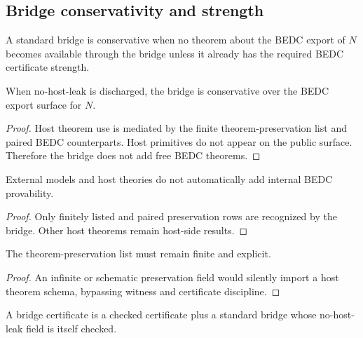 \subsection{Bridge conservativity and strength}
\label{subsec:philosophy-bridge-conservativity-strength}

\begin{definition}
\label{def:philosophy-bridge-conservativity}
A standard bridge is conservative when no theorem about the BEDC export
of \(N\) becomes available through the bridge unless it already has the
required BEDC certificate strength.
\end{definition}

\begin{theorem}
\label{thm:philosophy-no-host-leak-bridge-conservativity}
When no-host-leak is discharged, the bridge is conservative over the
BEDC export surface for \(N\).
\end{theorem}
\begin{proof}
Host theorem use is mediated by the finite theorem-preservation list
and paired BEDC counterparts. Host primitives do not appear on the
public surface. Therefore the bridge does not add free BEDC theorems.
\end{proof}

\begin{corollary}
\label{cor:philosophy-external-models-not-expand-truth}
External models and host theories do not automatically add internal
BEDC provability.
\end{corollary}
\begin{proof}
Only finitely listed and paired preservation rows are recognized by the
bridge. Other host theorems remain host-side results.
\end{proof}

\begin{corollary}
\label{cor:philosophy-theorem-preservation-finite}
The theorem-preservation list must remain finite and explicit.
\end{corollary}
\begin{proof}
An infinite or schematic preservation field would silently import a
host theorem schema, bypassing witness and certificate discipline.
\end{proof}

\begin{definition}
\label{def:philosophy-bridge-certificate}
A bridge certificate is a checked certificate plus a standard bridge
whose no-host-leak field is itself checked.
\end{definition}

